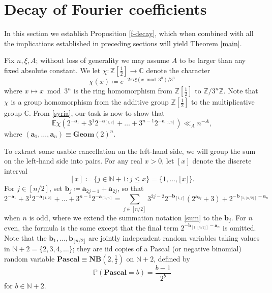 \documentclass[12pt,a4paper,reqno]{amsart}
\numberwithin{equation}{section}
\theoremstyle{plain}
\theoremstyle{definition}
\renewcommand\P{\mathbb{P}}
\newcommand\E{\mathbb{E}}
\newcommand\Z{\mathbb{Z}}
\newcommand\N{\mathbb{N}}
\renewcommand\a{\mathbf{a}}
\renewcommand\b{\mathbf{b}}
\newcommand\Geom{\mathbf{Geom}}
\newcommand\Pascal{\mathbf{Pascal}}
\newcommand\C{\mathbb{C}}
\renewcommand{\mod}{\bmod}
\begin{document}
\section{Decay of Fourier coefficients}\label{fourier-sec}

In this section we establish Proposition \ref{f-decay}, which when combined with all the implications established in preceding sections will yield Theorem \ref{main}.

Fix $n, \xi, A$; without loss of generality we may assume $A$ to be larger than any fixed absolute constant.  We let $\chi\colon \Z[\frac{1}{2}] \to \C$ denote the character
\begin{equation}\label{chin}
 \chi(x) \coloneqq e^{-2\pi i \xi (x \mod 3^n) / 3^n}
\end{equation}
where $x \mapsto x \mod 3^n$ is the ring homomorphism from $\Z[\frac{1}{2}]$ to $\Z/3^n\Z$.  Note that $\chi$ is a group homomorphism from the additive group $\Z[\frac{1}{2}]$ to the multiplicative group $\C$. From \eqref{syria}, our task is now to show that
\begin{equation}\label{echi}
\E \chi( 2^{-\a_1} + 3^1 2^{-\a_{[1,2]}} + \dots + 3^{n-1} 2^{-\a_{[1,n]}} ) \ll_A n^{-A},
\end{equation}
where $(\a_1,\dots,\a_n) \equiv \Geom(2)^n$.

To extract some usable cancellation on the left-hand side, we will group the sum on the left-hand side into pairs.  For any real $x>0$, let $[x]$ denote the discrete interval
$$ [x] \coloneqq \{j \in \N+1: j \leq x \} = \{ 1, \dots, \lfloor x\rfloor\}.$$
For $j \in [n/2]$, set $\b_j \coloneqq \a_{2j-1} + \a_{2j}$, so that
$$2^{-\a_1} + 3^1 2^{-\a_{[1,2]}} + \dots + 3^{n-1} 2^{-\a_{[1,n]}} = \sum_{j \in [n/2]} 3^{2j-2} 2^{-\b_{[1,j]}} ( 2^{\a_{2j}} + 3 ) + 2^{-\b_{[1,\lfloor n/2\rfloor]}-\a_n}$$
when $n$ is odd, where we extend the summation notation \eqref{sum} to the $\b_j$.  For $n$ even, the formula is the same except that the final term $2^{-\b_{[1,\lfloor n/2\rfloor]}-\a_n}$ is omitted.  Note that the $\b_1,\dots,\b_{\lfloor n/2\rfloor}$ are jointly independent random variables taking values in $\N+2 = \{2,3,4,\dots\}$; they are iid copies of a Pascal (or negative binomial) random variable $\Pascal \equiv \mathbf{NB}(2,\frac{1}{2})$ on $\N+2$, defined by
$$ \P( \Pascal = b ) = \frac{b-1}{2^b}$$
for $b \in \N+2$.
\end{document}
